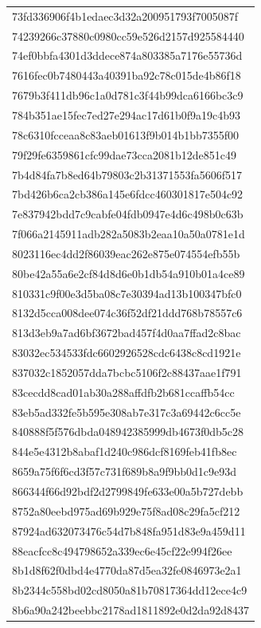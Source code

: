 \begin{tabular}{l}
73fd336906f4b1edaec3d32a200951793f7005087f \\
74239266c37880c0980cc59e526d2157d925584440 \\
74ef0bbfa4301d3ddece874a803385a7176e55736d \\
7616fec0b7480443a40391ba92c78c015de4b86f18 \\
7679b3f411db96c1a0d781c3f44b99dca6166bc3c9 \\
784b351ae15fec7ed27e294ac17d61b0f9a19c4b93 \\
78c6310fcceaa8c83aeb01613f9b014b1bb7355f00 \\
79f29fe6359861cfc99dae73cca2081b12de851c49 \\
7b4d84fa7b8ed64b79803c2b31371553fa5606f517 \\
7bd426b6ca2cb386a145e6fdcc460301817e504c92 \\
7e837942bdd7c9cabfe04fdb0947e4d6c498b0c63b \\
7f066a2145911adb282a5083b2eaa10a50a0781e1d \\
8023116ec4dd2f86039eac262e875e074554efb55b \\
80be42a55a6e2cf84d8d6e0b1db54a910b01a4ce89 \\
810331c9f00e3d5ba08c7e30394ad13b100347bfc0 \\
8132d5cca008dee074c36f52df21ddd768b78557c6 \\
813d3eb9a7ad6bf3672bad457f4d0aa7ffad2c8bac \\
83032ec534533fdc6602926528cdc6438c8cd1921e \\
837032c1852057dda7bcbc5106f2c88437aae1f791 \\
83cecdd8cad01ab30a288affdfb2b681ccaffb54cc \\
83eb5ad332fe5b595e308ab7e317c3a69442c6cc5e \\
840888f5f576dbda048942385999db4673f0db5c28 \\
844e5e4312b8abaf1d240c986dcf8169feb41fb8ec \\
8659a75f6f6cd3f57c731f689b8a9f9bb0d1c9e93d \\
866344f66d92bdf2d2799849fe633e00a5b727debb \\
8752a80eebd975ad69b929e75f8ad08c29fa5cf212 \\
87924ad632073476c54d7b848fa951d83e9a459d11 \\
88eacfcc8c494798652a339ec6e45cf22e994f26ee \\
8b1d8f62f0dbd4e4770da87d5ea32fe0846973e2a1 \\
8b2344c558bd02cd8050a81b70817364dd12ece4c9 \\
8b6a90a242beebbc2178ad1811892e0d2da92d8437 \\

\end{tabular}

